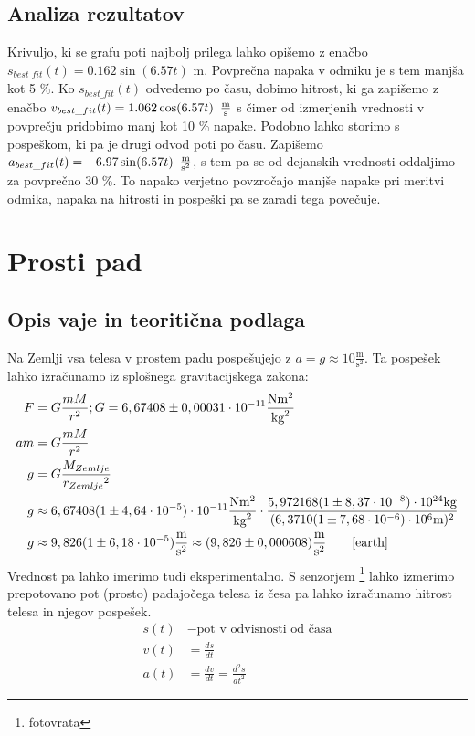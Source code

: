 \documentclass[12pt]{article}
\begin{document}
	\subsection*{Analiza rezultatov}
	Krivuljo, ki se grafu poti najbolj prilega lahko opišemo z enačbo $s_{best\_fit}(t) = 0.162 \sin(6.57t) \text{ m}$.
	Povprečna napaka v odmiku je s tem manjša kot 5 \%. Ko $s_{best\_fit}(t)$ odvedemo po 
	času, dobimo hitrost, ki ga zapišemo z enačbo $v_{best\_fit}(t) = 1.062 \cos(6.57t) \enskip \frac{\text{m}}{\text{s}}$
	s čimer od izmerjenih vrednosti v povprečju pridobimo manj kot 10 \% napake. Podobno
	lahko storimo s pospeškom, ki pa je drugi odvod poti po času. Zapišemo 
	$a_{best\_fit}(t) = - 6.97 \sin(6.57t) \enskip \frac{\text{m}}{\text{s}^2}$, s tem pa se od dejanskih vrednosti oddaljimo
	za povprečno 30 \%. To napako verjetno povzročajo manjše napake pri meritvi odmika,
	napaka na hitrosti in pospeški pa se zaradi tega povečuje.
	
	
\newpage
\section{Prosti pad}
 	\subsection*{Opis vaje in teoritična podlaga}
	Na Zemlji vsa telesa v prostem padu pospešujejo z $ a = g \approx 10 \frac{\text{m}}{{\text{s}}^2}$.
	Ta pospešek lahko izračunamo iz splošnega gravitacijskega zakona:
	\begin{equation}
		\label{gravity}
		\begin{split}
			F &= G \frac{mM}{r^2}; G = 6,67408 \pm 0,00031 \cdot 10^{-11} \frac{\text{N}\text{m}^2}{\text{kg}^2} \\
			a m &= G \frac{mM}{r^2} \\
			g &= G \frac{M_{Zemlje}}{{r_{Zemlje}}^2} \\
			g &\approx 6,67408 (1 \pm 4,64 \cdot 10^{-5}) \cdot 10^{-11} \frac{\text{N}\text{m}^2}{\text{kg}^2} \cdot \frac{5,972168 (1 \pm 8,37 \cdot 10 ^{-8}) \cdot 10^{24} \text{kg} }{(6,3710 (1 \pm 7,68 \cdot 10^{-6}) \cdot 10^6 \text{m}) ^2} \\
			g &\approx 9,826 (1 \pm 6,18 \cdot 10^{-5}) \frac{\text{m}}{\text{s}^2} \approx (9,826 \pm 0,000608) \frac{\text{m}}{\text{s}^2} \qquad \mbox{\cite{earth}}
		\end{split}
	\end{equation}
	Vrednost pa lahko imerimo tudi eksperimentalno. S senzorjem \footnote{fotovrata} lahko
	izmerimo prepotovano pot (prosto) padajočega telesa iz česa pa lahko izračunamo hitrost
	telesa in njegov pospešek.
	\begin{equation}
		\begin{split}
			s(t) &- \text{pot v odvisnosti od časa} \\
			v(t) &= \frac{ds}{dt} \\
			a(t) &= \frac{dv}{dt} = \frac{d^2s}{{dt}^2}
		\end{split}	
	\end{equation}
\end{document}
